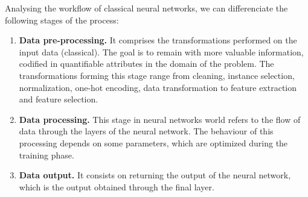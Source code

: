 Analysing the workflow of classical neural networks, we can differenciate the following stages of the process:
\begin{enumerate}
    \item \textbf{Data pre-processing. } It comprises the transformations performed on the input data (classical). The goal is to remain with more valuable information, codified in quantifiable attributes in the domain of the problem. The transformations forming this stage range from cleaning, instance selection, normalization, one-hot encoding, data transformation to feature extraction and feature selection.

    \item \textbf{Data processing. } This stage in neural networks world refers to the flow of data through the layers of the neural network. The behaviour of this processing depends on some parameters, which are optimized during the training phase.

    \item \textbf{Data output. } It consists on returning the output of the neural network, which is the output obtained through the final layer. 
\end{enumerate}

